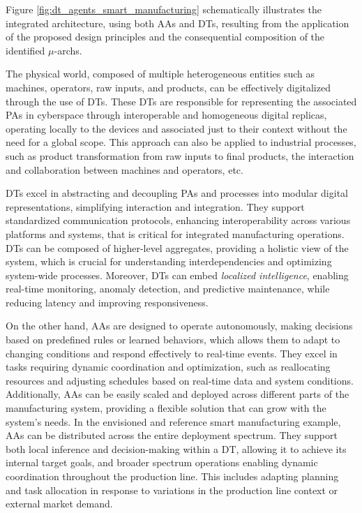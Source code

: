 Figure \ref{fig:dt_agents_smart_manufacturing} schematically illustrates the integrated architecture, using both AAs and DTs, resulting from the application of the proposed design principles and the consequential composition of the identified $\mu$-archs.

The physical world, composed of multiple heterogeneous entities such as machines, operators, raw inputs, and products, can be effectively digitalized through the use of DTs.
These DTs are responsible for representing the associated PAs in cyberspace through interoperable and homogeneous digital replicas, operating locally to the devices and associated just to their context without the need for a global scope.
This approach can also be applied to industrial processes, such as product transformation from raw inputs to final products, the interaction and collaboration between machines and operators, etc.

DTs excel in abstracting and decoupling PAs and processes into modular digital representations, simplifying interaction and integration. They support standardized communication protocols, enhancing interoperability across various platforms and systems, that is critical for integrated manufacturing operations. DTs can be composed of higher-level aggregates, providing a holistic view of the system, which is crucial for understanding interdependencies and optimizing system-wide processes.
%
Moreover, DTs can embed \emph{localized intelligence}, enabling real-time monitoring, anomaly detection, and predictive maintenance, while reducing latency and improving responsiveness.

On the other hand, AAs are designed to operate autonomously, making decisions based on predefined rules or learned behaviors, which allows them to adapt to changing conditions and respond effectively to real-time events. They excel in tasks requiring dynamic coordination and optimization, such as reallocating resources and adjusting schedules based on real-time data and system conditions. Additionally, AAs can be easily scaled and deployed across different parts of the manufacturing system, providing a flexible solution that can grow with the system’s needs.
%
In the envisioned and reference smart manufacturing example, AAs can be distributed across the entire deployment spectrum. They support both local inference and decision-making within a DT, allowing it to achieve its internal target goals, and broader spectrum operations enabling dynamic coordination throughout the production line. This includes adapting planning and task allocation in response to variations in the production line context or external market demand. 

